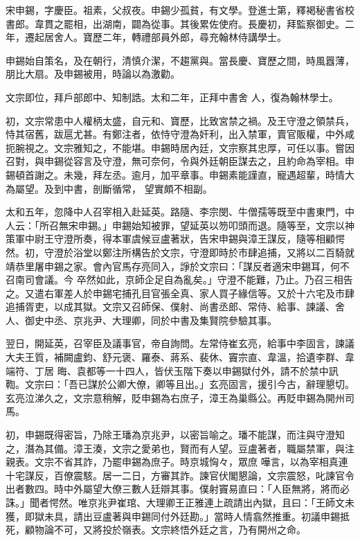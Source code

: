 \begin{pinyinscope}
 宋申錫，字慶臣。祖素，父叔夜。申錫少孤貧，有文學。登進士第，釋褐秘書省校書郎。韋貫之罷相，出湖南，闢為從事。其後累佐使府。長慶初，拜監察御史。二年，遷起居舍人。寶歷二年，轉禮部員外郎，尋充翰林侍講學士。



 申錫始自策名，及在朝行，清慎介潔，不趨黨與。當長慶、寶歷之間，時風囂薄，朋比大扇。及申錫被用，時論以為激勸。



 文宗即位，拜戶部郎中、知制誥。太和二年，正拜中書舍
 人，復為翰林學士。



 初，文宗常患中人權柄太盛，自元和、寶歷，比致宮禁之禍。及王守澄之領禁兵，恃其宿舊，跋扈尤甚。有鄭注者，依恃守澄為奸利，出入禁軍，賣官販權，中外咸扼腕視之。文宗雅知之，不能堪。申錫時居內廷，文宗察其忠厚，可任以事。嘗因召對，與申錫從容言及守澄，無可奈何，令與外廷朝臣謀去之，且約命為宰相。申錫頓首謝之。未幾，拜左丞。逾月，加平章事。申錫素能謹直，寵遇超輩，時情大為屬望。及到中書，剖斷循常，
 望實頗不相副。



 太和五年，忽降中人召宰相入赴延英。路隨、李宗閔、牛僧孺等既至中書東門，中人云：「所召無宋申錫。」申錫始知被罪，望延英以笏叩頭而退。隨等至，文宗以神策軍中尉王守澄所奏，得本軍虞候豆盧著狀，告宋申錫與漳王謀反，隨等相顧愕然。初，守澄於浴堂以鄭注所構告於文宗，守澄即時於市肆追捕，又將以二百騎就靖恭里屠申錫之家。會內官馬存亮同入，諍於文宗曰：「謀反者適宋申錫耳，何不召南司會議。今
 卒然如此，京師企足自為亂矣。」守澄不能難，乃止。乃召三相告之。又遣右軍差人於申錫宅捕孔目官張全真、家人買子緣信等。又於十六宅及市肆追捕胥吏，以成其獄。文宗又召師保、僕射、尚書丞郎、常侍、給事、諫議、舍人、御史中丞、京兆尹、大理卿，同於中書及集賢院參驗其事。



 翌日，開延英，召宰臣及議事官，帝自詢問。左常侍崔玄亮，給事中李固言，諫議大夫王質，補闕盧鈞、舒元褒、羅泰、蔣系、裴休、竇宗直、韋溫，拾遺李群、韋端符、丁居
 晦、袁都等一十四人，皆伏玉階下奏以申錫獄付外，請不於禁中訊鞫。文宗曰：「吾已謀於公卿大僚，卿等且出。」玄亮固言，援引今古，辭理懇切。玄亮泣涕久之，文宗意稍解，貶申錫為右庶子，漳王為巢縣公。再貶申錫為開州司馬。



 初，申錫既得密旨，乃除王璠為京兆尹，以密旨喻之。璠不能謀，而注與守澄知之，潛為其備。漳王湊，文宗之愛弟也，賢而有人望。豆盧著者，職屬禁軍，與注親表。文宗不省其詐，乃罷申錫為庶子。時京城恟々，眾庶
 嘩言，以為宰相真連十宅謀反，百僚震駭。居一二日，方審其詐。諫官伏閣懇論，文宗震怒，叱諫官令出者數四。時中外屬望大僚三數人廷辯其事。僕射竇易直曰：「人臣無將，將而必誅。」聞者愕然。唯京兆尹崔琯、大理卿王正雅連上疏請出內獄，且曰：「王師文未獲，即獄未具，請出豆盧著與申錫同付外廷勘。」當時人情翕然推重。初議申錫抵死，顧物論不可，又將投於嶺表。文宗終悟外廷之言，乃有開州之命。




\end{pinyinscope}
